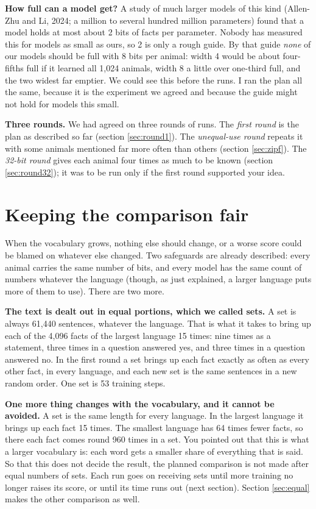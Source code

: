 \textbf{How full can a model get?} A study of much larger models of this kind (Allen-Zhu and
Li, 2024; a million to several hundred million parameters) found that a model holds at most
about 2 bits of facts per parameter. Nobody has measured this for models as small as ours, so
2 is only a rough guide. By that guide \emph{none} of our models should be full with 8 bits
per animal: width 4 would be about four-fifths full if it learned all 1,024 animals, width 8 a
little over one-third full, and the two widest far emptier. We could see this before the runs.
I ran the plan all the same, because it is the experiment we agreed and because the guide
might not hold for models this small.

\textbf{Three rounds.} We had agreed on three rounds of runs. The \emph{first round} is the
plan as described so far (section \ref{sec:round1}). The \emph{unequal-use round} repeats it
with some animals mentioned far more often than others (section \ref{sec:zipf}). The
\emph{32-bit round} gives each animal four times as much to be known (section
\ref{sec:round32}); it was to be run only if the first round supported your idea.

\section{Keeping the comparison fair}

When the vocabulary grows, nothing else should change, or a worse score could be blamed on
whatever else changed. Two safeguards are already described: every animal carries the same
number of bits, and every model has the same count of numbers whatever the language (though,
as just explained, a larger language puts more of them to use). There are two more.

\textbf{The text is dealt out in equal portions, which we called sets.} A set is always 61,440
sentences, whatever the language. That is what it takes to bring up each of the 4,096 facts of
the largest language 15 times: nine times as a statement, three times in a question answered
yes, and three times in a question answered no. In the first round a set brings up each fact
exactly as often as every other fact, in every language, and each new set is the same sentences
in a new random order. One set is 53 training steps.

\textbf{One more thing changes with the vocabulary, and it cannot be avoided.} A set is the
same length for every language. In the largest language it brings up each fact 15 times. The
smallest language has 64 times fewer facts, so there each fact comes round 960 times in a
set. You pointed out that this is what a larger vocabulary is: each word gets a smaller share
of everything that is said. So that this does not decide the result, the planned comparison is
not made after equal numbers of sets. Each run goes on receiving sets until more training no
longer raises its score, or until its time runs out (next section). Section \ref{sec:equal}
makes the other comparison as well.

